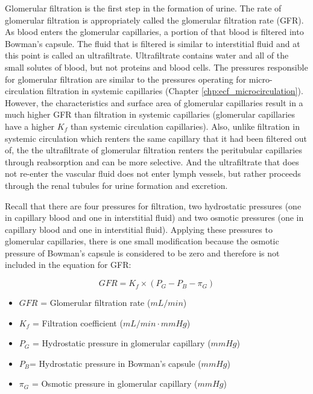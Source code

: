 Glomerular filtration is the first step in the formation of urine. The rate of glomerular filtration is appropriately called the glomerular filtration rate (GFR). As blood enters the glomerular capillaries, a portion of that blood is filtered into Bowman’s capsule. The fluid that is filtered is similar to interstitial fluid and at this point is called an ultrafiltrate. Ultrafiltrate contains water and all of the small solutes of blood, but not proteins and blood cells. The pressures responsible for glomerular filtration are similar to the pressures operating for micro-circulation filtration in systemic capillaries (Chapter \ref{chp:ecf_microcirculation}). However, the characteristics and surface area of glomerular capillaries result in a much higher GFR than filtration in systemic capillaries (glomerular capillaries have a higher $K_f$ than systemic circulation capillaries). Also, unlike filtration in systemic circulation which renters the same capillary that it had been filtered out of, the the ultrafiltrate of glomerular filtration renters the peritubular capillaries through reabsorption and can be more selective. And the ultrafiltrate that does not re-enter the vascular fluid does not enter lymph vessels, but rather proceeds through the renal tubules for urine formation and excretion.

Recall that there are four pressures for filtration, two hydrostatic pressures (one in capillary blood and one in interstitial fluid) and two osmotic pressures (one in capillary blood and one in interstitial fluid). Applying these pressures to glomerular capillaries, there is one small modification because the osmotic pressure of Bowman’s capsule is considered to be zero and therefore is not included in the equation for GFR:

\begin{equation}
GFR = K_f \times (P_{G} - P_{B} - \pi_{G})
\label{GFR}
\end{equation}

\begin{itemize}
\item $GFR$ = Glomerular filtration rate ($mL/min$) 
\item $K_f$ = Filtration coefficient ($mL/min \cdot mm Hg$) 
\item $P_{G}$ = Hydrostatic pressure in glomerular capillary ($mm Hg$) 
\item $P_{B} $= Hydrostatic pressure in Bowman’s capsule ($mm Hg$) 
\item $\pi_{G}$ = Osmotic pressure in glomerular capillary ($mm Hg$) 
\end{itemize} 


